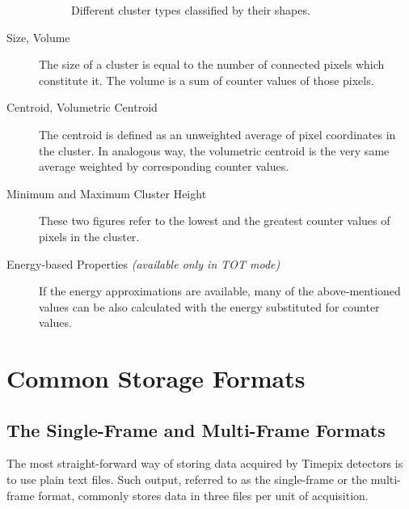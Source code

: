 \begin{description}
\begin{figure}[t]
\begin{center}
    \caption{Different cluster types classified by their shapes.}
    \label{fig:cluster-types}
    \end{center}
    \end{figure}

	\item[Size, Volume]
	The size of a cluster is equal to the number of connected pixels which constitute it. The volume is a sum of counter values of those pixels.

	\item[Centroid, Volumetric Centroid]
	The centroid is defined as an unweighted average of pixel coordinates in the cluster. In analogous way, the volumetric centroid is the very same average weighted by corresponding counter values. 

	\item[Minimum and Maximum Cluster Height]
	These two figures refer to the lowest and the greatest counter values of pixels in the cluster.

	\item[Energy-based Properties \textit{(available only in TOT mode)}]
	If the energy approximations are available, many of the above-mentioned values can be also calculated with the energy substituted for counter values.
\end{description}

\section{Common Storage Formats}
\label{db:storage-formats}

\subsection{The Single-Frame and Multi-Frame Formats}
The most straight-forward way of storing data acquired by Timepix detectors is to use plain text files. Such output, referred to as the single-frame or the multi-frame format, commonly stores data in three files per unit of acquisition.

